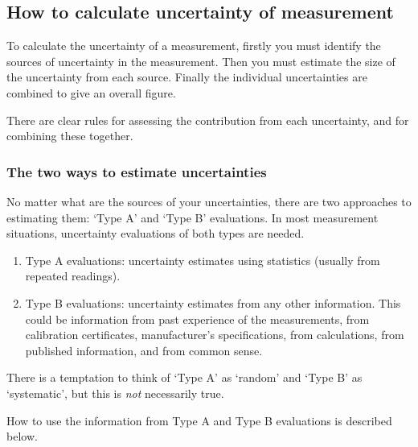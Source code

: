 \subsection{How to calculate uncertainty of measurement}
To calculate the uncertainty of a measurement, firstly you must identify the sources of uncertainty in the measurement. Then you must estimate the size of the uncertainty from each source. Finally the individual uncertainties are combined to give an overall figure.

There are clear rules for assessing the contribution from each uncertainty, and for combining these together.

\subsubsection{The two ways to estimate uncertainties}
No matter what are the sources of your uncertainties, there are two approaches to estimating them: `Type A' and `Type B' evaluations. In most measurement situations, uncertainty evaluations of both types are needed.
\begin{enumerate}
\item Type A evaluations: uncertainty estimates using statistics (usually from repeated readings).
%
\item Type B evaluations: uncertainty estimates from any other information. This could be information from past experience of the measurements, from calibration certificates, manufacturer's specifications, from calculations, from published information, and from common sense.
\end{enumerate}
There is a temptation to think of `Type A' as `random' and `Type B' as `systematic', but this is \emph{not} necessarily true.

How to use the information from Type A and Type B evaluations is described below.


